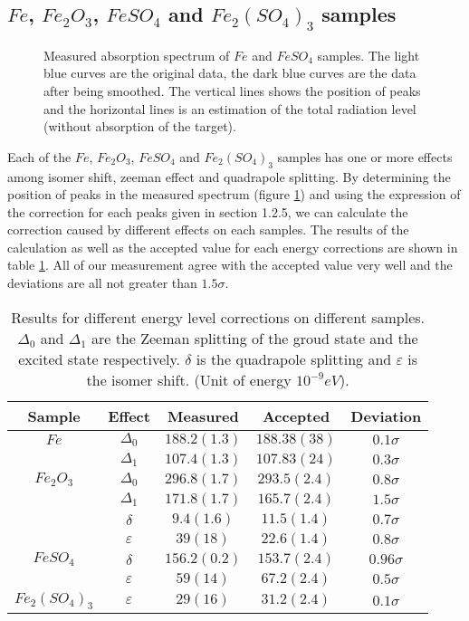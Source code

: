 \documentclass[aps,twocolumn,secnumarabic,balancelastpage,amsmath,amssymb,nofootinbib]{revtex4}
\begin{document}
\subsection{$Fe$, $Fe_2O_3$, $FeSO_4$ and $Fe_2(SO_4)_3$ samples}
\begin{figure}
  \caption{Measured absorption spectrum of  $Fe$ and  $FeSO_4$ samples. The light blue curves are the original data, the dark blue curves are the data after being smoothed. The vertical lines shows the position of peaks and the horizontal lines is an estimation of the total radiation level (without absorption of the target).}
  \label{samples_raw}
\end{figure}

Each of the $Fe$, $Fe_2O_3$, $FeSO_4$ and $Fe_2(SO_4)_3$ samples has one or more effects among isomer shift, zeeman effect and quadrapole splitting. By determining the position of peaks in the measured spectrum (figure \ref{samples_raw}) and using the expression of the correction for each peaks given in section 1.2.5, we can calculate the correction caused by different effects on each samples. The results of the calculation as well as the accepted value for each energy corrections are shown in table \ref{res_table}. All of our measurement agree with the accepted value very well and the deviations are all not greater than $1.5\sigma$.

\begin{table}
  \begin{tabular}{|c|c|c|c|c|}
    \hline
    Sample&Effect&Measured&Accepted&Deviation\\\hline
    $Fe$\cite{data3}&$\Delta_0$&$188.2(1.3)$&$188.38(38)$&$0.1\sigma$\\\cline{2-5}
    &$\Delta_1$&$107.4(1.3)$&$107.83(24)$&$0.3\sigma$\\\hline
    $Fe_2O_3$\cite{data1}\cite{data2}&$\Delta_0$&$296.8(1.7)$&$293.5(2.4)$&$0.8\sigma$\\\cline{2-5}
    &$\Delta_1$&$171.8(1.7)$&$165.7(2.4)$&$1.5\sigma$\\\cline{2-5}
    &$\delta$&$9.4(1.6)$&$11.5(1.4)$&$0.7\sigma$\\\cline{2-5}
    &$\varepsilon$&$39(18)$&$22.6(1.4)$&$0.8\sigma$\\\hline
    $FeSO_4$\cite{data1}&$\delta$&$156.2(0.2)$&$153.7(2.4)$&$0.96\sigma$\\\cline{2-5}
    &$\varepsilon$&$59(14)$&$67.2(2.4)$&$0.5\sigma$\\\hline
    $Fe_2(SO_4)_3$\cite{data1}&$\varepsilon$&$29(16)$&$31.2(2.4)$&$0.1\sigma$\\\hline
  \end{tabular}
  \caption{Results for different energy level corrections on different samples. $\Delta_0$ and $\Delta_1$ are the Zeeman splitting of the groud state and the excited state respectively. $\delta$ is the quadrapole splitting and $\varepsilon$ is the isomer shift. (Unit of energy $10^{-9}eV$).}
  \label{res_table}
\end{table}
\end{document}
